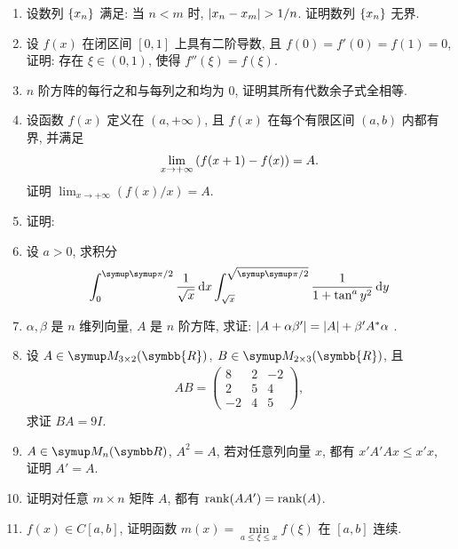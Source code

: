 \documentclass{ctexart}
\let\umathpi\pi
\renewcommand\pi{\symup\umathpi}%
\let\set\qty
\let\le\leqslant
\newcommand{\limit}[2]{\lim_{#1 \to #2}}
\newcommand{\me}{\symrm{e}}
\newcommand{\R}{\ensuremath{\symbb{R}}}
\begin{document}
\begin{enumerate}[series=exer]
    \item 设数列 $ \set{x_{n}} $ 满足: 当 $ n < m $ 时, $ \abs{x_{n} - x_{m}} > 1/n $. 证明数列 $ \set{x_{n}} $ 无界.
    \item 设 $ f(x) $ 在闭区间 $ [0, 1] $ 上具有二阶导数, 且 $ f(0) = f'(0) = f(1) = 0 $, 证明: 存在 $ \xi \in (0, 1) $, 使得 $ f''(\xi) = f(\xi) $.
    \item $ n $ 阶方阵的每行之和与每列之和均为 0, 证明其所有代数余子式全相等.
    \item 设函数 $ f(x) $ 定义在 $ (a, +\infty) $, 且 $ f(x) $ 在每个有限区间 $ (a, b) $ 内都有界, 并满足
    \begin{align*}
        \limit{x}{+\infty} \qty(f(x + 1) - f(x)) = A.
    \end{align*}
    证明 $ \limit{x}{+\infty} (f(x) / x) = A $. 
    \item 证明: 
    \item 设 $ a > 0 $, 求积分
    \begin{align*}
        \int_{0}^{\pi/2} \frac{1}{\sqrt{x}} \dd{x} \int_{\sqrt{x}}^{\sqrt{\pi/2}} \frac{1}{1 + \tan^{a}y^{2}} \dd{y}
    \end{align*}
    \item $ \alpha, \beta $ 是 $ n $ 维列向量, $ A $ 是 $ n $ 阶方阵, 求证: $ \abs{A + \alpha\beta'} = \abs{A} + \beta'A^{*}\alpha $ . 
    \item 设 $ A \in \MM[\R][3\times 2] $, $ B \in \MM[\R][2 \times 3] $, 且
    \begin{align*}
        AB = \begin{pmatrix}
            8 & 2 & -2 \\
            2 & 5 & 4 \\
            -2 & 4 & 5
        \end{pmatrix},
    \end{align*}
    求证 $ BA = 9 I $. 
    \item $ A \in \MM $, $ A^{2} = A $, 若对任意列向量 $ x $, 都有 $ x'A'Ax \le x'x $, 证明 $ A' = A $.    
    \item 证明对任意 $ m \times n $ 矩阵 $ A $, 都有 $ \rank(AA') = \rank(A) $.  
    \item $ f(x) \in C[a, b] $, 证明函数 $ m(x) = \min\limits_{a \le \xi \le x}f(\xi) $ 在 $ [a, b] $ 连续.

\end{enumerate}
\end{document}
